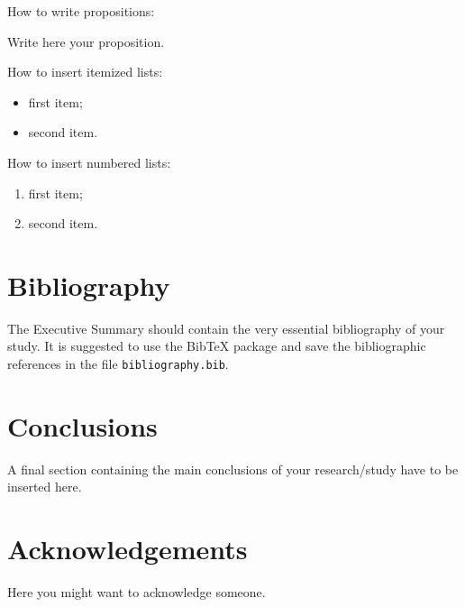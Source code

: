 \documentclass[11pt,a4paper,twocolumn]{article}
\begin{document}
How to write propositions:
\begin{proposition}
Write here your proposition.
\end{proposition}
\vspace{0.3cm} %

How to insert itemized lists:
\begin{itemize}
    \item first item;
    \item second item.
\end{itemize}
How to insert numbered lists:
\begin{enumerate}
    \item first item;
    \item second item.
\end{enumerate}

\section{Bibliography}
\label{sec:bibliography}
The Executive Summary should contain the very essential bibliography of your study.
It is suggested to use the BibTeX package \cite{bibtex} and save the bibliographic references
in the file  \verb|bibliography.bib|.

\section{Conclusions}
A final section containing the main conclusions of your research/study have to be inserted here.

\section{Acknowledgements}
Here you might want to acknowledge someone.

\end{document}
